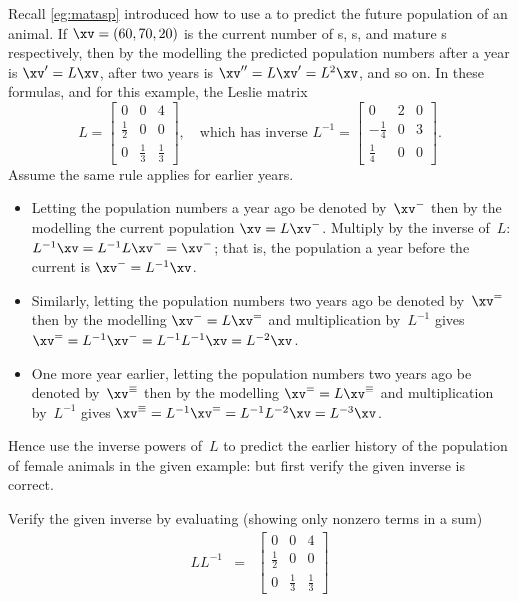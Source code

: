\begin{example} \label{eg:invph}
Recall \autoref{eg:matasp} introduced how to use a  to predict the future population of an animal.
If \(\xv=(60,70,20)\) is the current number of s, s, and mature s respectively, then by the modelling the predicted population numbers after a year is \(\xv'=L\xv\), after two years is \(\xv''=L\xv'=L^2\xv\), and so on.
In these formulas, and for this example, the Leslie matrix
\begin{equation*}
L=\begin{bmatrix} 0&0&4\\\frac12&0&0\\0&\frac13&\frac13 \end{bmatrix},
\quad\text{which has inverse }L^{-1}=\begin{bmatrix} 0&2&0\\-\frac14&0&3\\\frac14&0&0 \end{bmatrix}.
\end{equation*} 
Assume the same rule applies for earlier years.
\begin{itemize}
\item Letting the population numbers a year ago be denoted by~\(\xv^-\) then by the modelling the current population \(\xv=L\xv^-\).
Multiply by the inverse of~\(L\): \(L^{-1}\xv=L^{-1}L\xv^-=\xv^-\); that is, the population a year before the current is \(\xv^-=L^{-1}\xv\).
\item Similarly, letting the population numbers two years ago be denoted by~\(\xv^=\) then  by the modelling \(\xv^-=L\xv^=\) and multiplication by~\(L^{-1}\) gives \(\xv^==L^{-1}\xv^-=L^{-1}L^{-1}\xv=L^{-2}\xv\).
\item One more year earlier, letting the population numbers two years ago be denoted by~\(\xv^\equiv\) then  by the modelling \(\xv^==L\xv^\equiv\) and multiplication by~\(L^{-1}\) gives \(\xv^\equiv=L^{-1}\xv^==L^{-1}L^{-2}\xv=L^{-3}\xv\).
\end{itemize}
Hence use the inverse powers of~\(L\) to predict the earlier history of the population of female animals in the given example: but first verify the given inverse is correct.
\begin{solution} 
Verify the given inverse by evaluating (showing only nonzero terms in a sum)
\begin{eqnarray*}
LL^{-1}&=&
\begin{bmatrix} 0&0&4\\\frac12&0&0\\0&\frac13&\frac13 \end{bmatrix}

\end{eqnarray*}
\end{solution}
\end{example}
